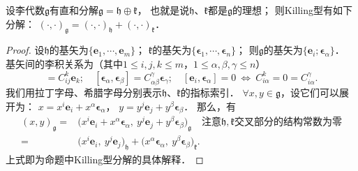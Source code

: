 \begin{proposition}\label{chlg:thm_Killing-oplus}
    设李代数$\mathfrak{g}$有直和分解$\mathfrak{g}=\mathfrak{h}\oplus\mathfrak{k}$，
    也就是说$\mathfrak{h}$、$\mathfrak{k}$都是$\mathfrak{g}$的理想；
    则Killing型有如下分解：
    $(\cdot,\cdot)_{\mathfrak{g}}=(\cdot,\cdot)_{\mathfrak{h}}+(\cdot,\cdot)_{\mathfrak{k}}$．
\end{proposition}
\begin{proof}
    设$\mathfrak{h}$的基矢为$\{\boldsymbol{e}_1,\cdots,\boldsymbol{e}_m\}$；
    $\mathfrak{k}$的基矢为$\{\boldsymbol{\epsilon}_1,\cdots,\boldsymbol{\epsilon}_n\}$；
    则$\mathfrak{g}$的基矢为$\{\boldsymbol{e}_i;\boldsymbol{\epsilon}_\alpha\}$．
    基矢间的李积关系为（其中$1\leqslant i,j,k \leqslant m$，$1\leqslant \alpha,\beta,\gamma \leqslant n$）
    \begin{equation*}
        [\boldsymbol{e}_i,\boldsymbol{e}_j]=C_{ij}^k \boldsymbol{e}_k;\quad
        [\boldsymbol{\epsilon}_\alpha,\boldsymbol{\epsilon}_\beta]=C_{\alpha\beta}^\gamma \boldsymbol{\epsilon}_\gamma;\quad
        [\boldsymbol{e}_i,\boldsymbol{\epsilon}_\alpha]=0   \  \Leftrightarrow \ 
        C_{i\alpha}^k=0=C_{i\alpha}^\gamma.
    \end{equation*}
    我们用拉丁字母、希腊字母分别表示$\mathfrak{h}$、$\mathfrak{k}$的指标索引．
    $\forall x,y \in \mathfrak{g}$，设它们可以展开为：
    $x= x^i \boldsymbol{e}_i + x^\alpha \boldsymbol{\epsilon}_\alpha$，
    $y= y^j \boldsymbol{e}_j + y^\beta \boldsymbol{\epsilon}_\beta$．
    那么，有
    \begin{align*}
        (x,y)_{\mathfrak{g}}=& \bigl(x^i \boldsymbol{e}_i + x^\alpha \boldsymbol{\epsilon}_\alpha,\ 
         y^j \boldsymbol{e}_j + y^\beta \boldsymbol{\epsilon}_\beta\bigr)_{\mathfrak{g}}\quad
         \text{注意}\mathfrak{h},\mathfrak{k}\text{交叉部分的结构常数为零}\\
         =&\bigl(x^i\boldsymbol{e}_i ,\ y^j\boldsymbol{e}_j \bigr)_{\mathfrak{h}}
         + \bigl(x^\alpha\boldsymbol{\epsilon}_\alpha,\ y^\beta\boldsymbol{\epsilon}_\beta\bigr)_{\mathfrak{k}} .
    \end{align*}
    上式即为命题中Killing型分解的具体解释．
\end{proof}


